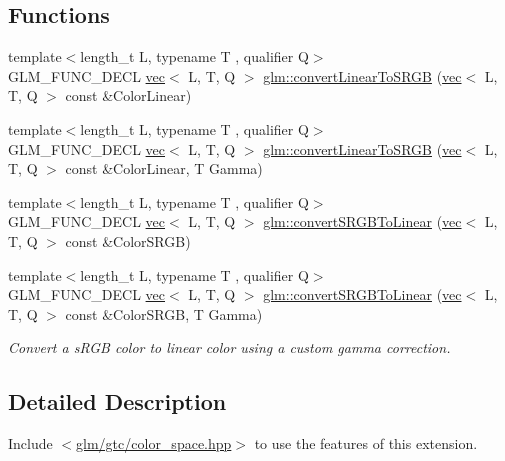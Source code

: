 \subsection*{Functions}
\begin{DoxyCompactItemize}
\item 
{\footnotesize template$<$length\+\_\+t L, typename T , qualifier Q$>$ }\\G\+L\+M\+\_\+\+F\+U\+N\+C\+\_\+\+D\+E\+CL \hyperlink{structglm_1_1vec}{vec}$<$ L, T, Q $>$ \hyperlink{group__gtc__color__space_ga42239e7b3da900f7ef37cec7e2476579}{glm\+::convert\+Linear\+To\+S\+R\+GB} (\hyperlink{structglm_1_1vec}{vec}$<$ L, T, Q $>$ const \&Color\+Linear)
\item 
{\footnotesize template$<$length\+\_\+t L, typename T , qualifier Q$>$ }\\G\+L\+M\+\_\+\+F\+U\+N\+C\+\_\+\+D\+E\+CL \hyperlink{structglm_1_1vec}{vec}$<$ L, T, Q $>$ \hyperlink{group__gtc__color__space_gaace0a21167d13d26116c283009af57f6}{glm\+::convert\+Linear\+To\+S\+R\+GB} (\hyperlink{structglm_1_1vec}{vec}$<$ L, T, Q $>$ const \&Color\+Linear, T Gamma)
\item 
{\footnotesize template$<$length\+\_\+t L, typename T , qualifier Q$>$ }\\G\+L\+M\+\_\+\+F\+U\+N\+C\+\_\+\+D\+E\+CL \hyperlink{structglm_1_1vec}{vec}$<$ L, T, Q $>$ \hyperlink{group__gtc__color__space_ga16c798b7a226b2c3079dedc55083d187}{glm\+::convert\+S\+R\+G\+B\+To\+Linear} (\hyperlink{structglm_1_1vec}{vec}$<$ L, T, Q $>$ const \&Color\+S\+R\+GB)
\item 
\mbox{\label{group__gtc__color__space_gad1b91f27a9726c9cb403f9fee6e2e200}} 
{\footnotesize template$<$length\+\_\+t L, typename T , qualifier Q$>$ }\\G\+L\+M\+\_\+\+F\+U\+N\+C\+\_\+\+D\+E\+CL \hyperlink{structglm_1_1vec}{vec}$<$ L, T, Q $>$ \hyperlink{group__gtc__color__space_gad1b91f27a9726c9cb403f9fee6e2e200}{glm\+::convert\+S\+R\+G\+B\+To\+Linear} (\hyperlink{structglm_1_1vec}{vec}$<$ L, T, Q $>$ const \&Color\+S\+R\+GB, T Gamma)
\begin{DoxyCompactList}\small\item\em Convert a s\+R\+GB color to linear color using a custom gamma correction. \end{DoxyCompactList}\end{DoxyCompactItemize}


\subsection{Detailed Description}
Include $<$\hyperlink{gtc_2color__space_8hpp}{glm/gtc/color\+\_\+space.\+hpp}$>$ to use the features of this extension.


